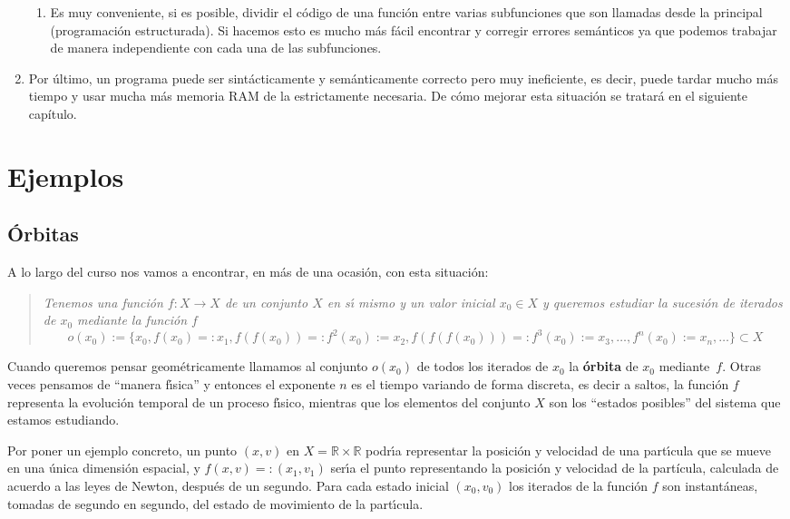 \begin{enumerate}
\begin{enumerate}
\item Es muy conveniente, si es posible, dividir el código de una función
entre varias subfunciones que son llamadas desde la principal (programación
estructurada). Si hacemos esto es mucho más fácil encontrar y corregir
errores semánticos ya que podemos trabajar de manera independiente con cada
una de las subfunciones.



 
\end{enumerate}

 
\item Por último,  un programa puede ser sintácticamente y semánticamente
correcto pero muy ineficiente, es decir, puede tardar mucho más tiempo y usar
mucha más memoria RAM de la estrictamente necesaria. De cómo mejorar esta
situación se tratará en el siguiente capítulo.

 
 
\end{enumerate}


\section{Ejemplos}
\subsection{\'Orbitas}
\label{orbitas}
A lo largo del curso nos vamos a encontrar, en más de una ocasi\'on, con
esta situaci\'on:

\begin{quotation}
\itshape Tenemos una funci\'on $f:X\to X$ de un conjunto $X$ en s\'{\i} mismo y
un valor inicial $x_0\in X$ y queremos estudiar la sucesi\'on de iterados de
$x_0$ mediante la funci\'on $f$
\[o(x_0):=\{x_0,f(x_0)=:x_1,f(f(x_0))=:f^2(x_0):=x_2,f(f(f(x_0)))=:f^3(x_0):=x_3
,\dots,f^n(x_0):=x_n ,\dots\}\subset X\]
\end{quotation}


Cuando queremos pensar geom\'etricamente llamamos al conjunto $o(x_0)$ de todos
los
iterados de $x_0$ la {\bf \'orbita} de $x_0$ mediante~$f$. Otras veces
pensamos de ``manera f\'{\i}sica'' y entonces el exponente $n$ es el tiempo
variando de forma discreta, es decir a saltos,  la funci\'on $f$ representa 
la evoluci\'on temporal de un proceso f\'{\i}sico,  mientras que los elementos
del conjunto $X$ son los ``estados posibles'' del sistema que estamos
estudiando. 

Por poner un ejemplo concreto, un punto $(x,v)$ en $X=\mathbb{R}\times
\mathbb{R}$ podr\'{\i}a representar la posici\'on y velocidad de una
part\'{\i}cula que se mueve en una \'unica dimensi\'on espacial, y
$f(x,v)=:(x_1,v_1)$ ser\'{\i}a  el punto representando la posici\'on y velocidad
de la part\'icula, calculada de acuerdo a las leyes de Newton, despu\'es de un
segundo. Para cada estado inicial $(x_0,v_0)$ los iterados de la funci\'on $f$
son instant\'aneas, tomadas de segundo en segundo, del estado de movimiento de
la part\'{\i}cula. 

